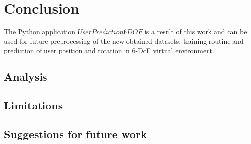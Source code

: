 \chapter{Conclusion}
\label{sec:conclusion}
The Python application $UserPrediction6DOF$ is a result of this work and can be used for future preprocessing of the new obtained datasets, training routine and prediction of user position and rotation in 6-DoF virtual environment. 

\section{Analysis}
\label{sec:conclusion:analysis}

\section{Limitations}
\label{sec:conclusion:limitations}

\section{Suggestions for future work}
\label{sec:conclusion:future}

